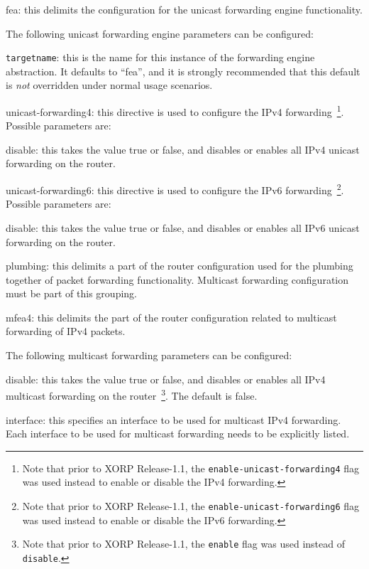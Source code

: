 \begin{description}
\item{\stt fea}: this delimits the configuration for the unicast
  forwarding engine functionality. 

  The following unicast forwarding engine parameters can be configured:
\begin{description}
\item{\tt targetname}: this is the name for this instance of the
  forwarding engine abstraction.  It defaults to ``{\stt fea}'', and
  it is strongly recommended that this default is {\it not} overridden
  under normal usage scenarios.
\end{description}
\item{\stt unicast-forwarding4}: this directive is used to configure the IPv4
  forwarding~\footnote{Note that prior to XORP Release-1.1, the
  {\tt enable-unicast-forwarding4} flag was used instead to enable or disable
  the IPv4 forwarding.}. Possible parameters are:
\begin{description}
\item{\stt disable}: this takes the value {\stt true} or {\stt false},
  and disables or enables all IPv4 unicast forwarding on the router.
\end{description}
\item{\stt unicast-forwarding6}: this directive is used to configure the IPv6
  forwarding~\footnote{Note that prior to XORP Release-1.1, the
  {\tt enable-unicast-forwarding6} flag was used instead to enable or disable
  the IPv6 forwarding.}. Possible parameters are:
\begin{description}
\item{\stt disable}: this takes the value {\stt true} or {\stt false},
  and disables or enables all IPv6 unicast forwarding on the router.
\end{description}
\item{\stt plumbing}: this delimits a part of the router configuration
  used for the plumbing together of packet forwarding functionality.
  Multicast forwarding configuration must be part of this grouping.
\item{\stt mfea4}: this delimits the part of the router configuration
  related to multicast forwarding of IPv4 packets.

  The following multicast forwarding parameters can be configured:
\begin{description}
\item{\stt disable}: this takes the value {\stt true} or {\stt false},
  and disables or enables all IPv4 multicast forwarding on the
  router~\footnote{Note that prior to XORP Release-1.1, the {\tt enable}
  flag was used instead of {\tt disable}.}.
  The default is {\stt false}.
\item{\stt interface}: this specifies an interface to be used for
  multicast IPv4 forwarding.  Each interface to be used for multicast
  forwarding needs to be explicitly listed.


\end{description}
\end{description}
